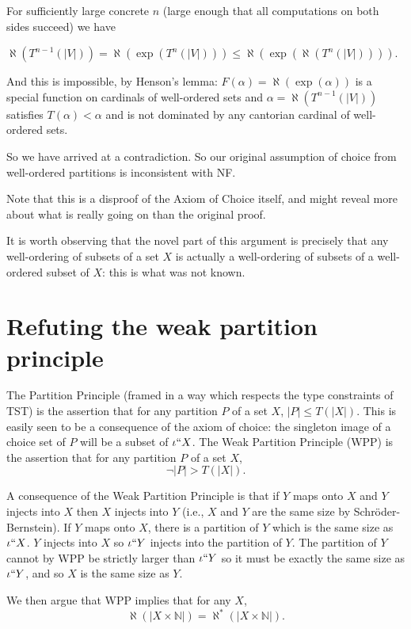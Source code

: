 \documentclass[12pt]{article}
\begin{document}
For sufficiently large concrete $n$ (large enough that all computations on both sides succeed) we have 

$\aleph(T^{n-1}(|V|))=\aleph(\exp(T^n(|V|))) \leq \aleph(\exp(\aleph(T^n(|V|))))$. 

And this is impossible, by Henson's lemma:  $F(\alpha) = \aleph(\exp(\alpha))$ is a special function on cardinals of well-ordered sets and $\alpha = \aleph(T^{n-1}(|V|))$ satisfies $T(\alpha)<\alpha$ and is not dominated by any cantorian cardinal of well-ordered sets.



So we have arrived at a contradiction.  So our original assumption of choice from well-ordered partitions is inconsistent with NF.

Note that this is a disproof of the Axiom of Choice itself, and might reveal more about what is really going on than the original proof.

It is worth observing that the novel part of this argument is precisely that any well-ordering of subsets of a set $X$ is actually a well-ordering of subsets of a well-ordered subset of $X$:  this is what was not known.



\section{Refuting the weak partition principle}

The Partition Principle (framed in a way which respects the type constraints of TST) is the assertion that for any partition $P$ of a set $X$, $|P| \leq T(|X|)$.  This is easily seen to be a consequence of the axiom of choice:  the singleton image of a choice set of $P$ will be a subset of $\iota``X$.  The Weak Partition Principle (WPP) is the assertion that for any partition $P$ of a set $X$, $$\neg |P|>T(|X|).$$  

A consequence of the Weak Partition Principle is that if $Y$ maps onto $X$ and $Y$ injects into $X$ then $X$ injects into $Y$ (i.e., $X$ and $Y$ are the same size by Schr\"oder-Bernstein).  If $Y$ maps onto $X$, there is a partition of $Y$ which is the same size as $\iota``X$.  $Y$ injects into $X$ so $\iota``Y$ injects into the partition of $Y$.  The partition of $Y$ cannot by WPP be strictly larger than $\iota``Y$ so it must be exactly the same size as $\iota``Y$, and so $X$ is the same size as $Y$.

We then argue that WPP implies that for any $X$, $$\aleph(|X \times \mathbb N|)=\aleph^*(|X \times \mathbb N|).$$
\end{document}
